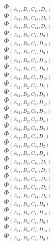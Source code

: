 \documentclass[14pt]{article}
\begin{document}
    $\Phi_{({A}_{11}, {B}_{1}, {C}_{10}, {D}_{3})}$ \\ 
    $\Phi_{({A}_{11}, {B}_{1}, {C}_{13}, {D}_{6})}$ \\ 
    $\Phi_{({A}_{11}, {B}_{1}, {C}_{14}, {D}_{6})}$ \\ 
    $\Phi_{({A}_{11}, {B}_{2}, {C}_{1}, {D}_{9})}$ \\ 
    $\Phi_{({A}_{11}, {B}_{2}, {C}_{1}, {D}_{10})}$ \\ 
    $\Phi_{({A}_{11}, {B}_{2}, {C}_{2}, {D}_{9})}$ \\ 
    $\Phi_{({A}_{11}, {B}_{2}, {C}_{2}, {D}_{10})}$ \\ 
    $\Phi_{({A}_{11}, {B}_{2}, {C}_{3}, {D}_{9})}$ \\ 
    $\Phi_{({A}_{11}, {B}_{2}, {C}_{3}, {D}_{10})}$ \\ 
    $\Phi_{({A}_{11}, {B}_{2}, {C}_{5}, {D}_{7})}$ \\ 
    $\Phi_{({A}_{11}, {B}_{2}, {C}_{5}, {D}_{8})}$ \\ 
    $\Phi_{({A}_{11}, {B}_{2}, {C}_{6}, {D}_{13})}$ \\ 
    $\Phi_{({A}_{11}, {B}_{2}, {C}_{6}, {D}_{14})}$ \\ 
    $\Phi_{({A}_{11}, {B}_{2}, {C}_{7}, {D}_{5})}$ \\ 
    $\Phi_{({A}_{11}, {B}_{2}, {C}_{8}, {D}_{5})}$ \\ 
    $\Phi_{({A}_{11}, {B}_{2}, {C}_{9}, {D}_{1})}$ \\ 
    $\Phi_{({A}_{11}, {B}_{2}, {C}_{9}, {D}_{2})}$ \\ 
    $\Phi_{({A}_{11}, {B}_{2}, {C}_{9}, {D}_{3})}$ \\ 
    $\Phi_{({A}_{11}, {B}_{2}, {C}_{10}, {D}_{1})}$ \\ 
    $\Phi_{({A}_{11}, {B}_{2}, {C}_{10}, {D}_{2})}$ \\ 
    $\Phi_{({A}_{11}, {B}_{2}, {C}_{10}, {D}_{3})}$ \\ 
    $\Phi_{({A}_{11}, {B}_{2}, {C}_{13}, {D}_{6})}$ \\ 
    $\Phi_{({A}_{11}, {B}_{2}, {C}_{14}, {D}_{6})}$ \\ 
    $\Phi_{({A}_{11}, {B}_{3}, {C}_{1}, {D}_{9})}$ \\ 
    $\Phi_{({A}_{11}, {B}_{3}, {C}_{1}, {D}_{10})}$ \\ 
    $\Phi_{({A}_{11}, {B}_{3}, {C}_{2}, {D}_{9})}$ \\ 
    $\Phi_{({A}_{11}, {B}_{3}, {C}_{2}, {D}_{10})}$ \\ 
    $\Phi_{({A}_{11}, {B}_{3}, {C}_{3}, {D}_{9})}$ \\ 
\end{document}
